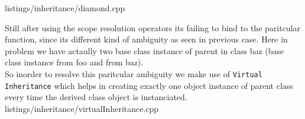 \documentclass[oops.tex]{subfiles}
\begin{document}

{listings/inheritance/diamond.cpp}

Still after using the scope resolution operators its failing to bind to the
paritcular function, since its different kind of ambiguity as seen in previous 
case. Here in problem we have actaully two base class instance of parent in class
baz (base class instance from foo and from baz). \\

So inorder to resolve this paritcular ambiguity we make use of \texttt{Virtual
Inheritance} which helps in creating exactly one object instance of parent class 
every time the derived class object is instanciated.\\


{listings/inheritance/virtualInheritance.cpp}
\end{document}
